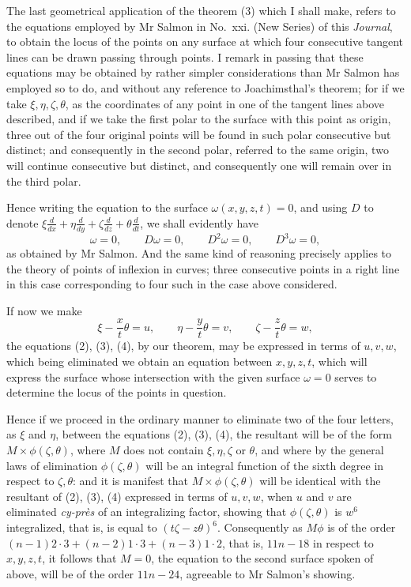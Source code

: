 \documentclass[11pt]{article}
\newcommand{\sourcepage}[1]{\marginpar{\scriptsize p.~#1}}
\begin{document}
{{The last geometrical application of the theorem (3) which I shall make, refers to the equations employed by Mr Salmon in No.~xxi. (New Series) of this \emph{Journal}, to obtain the locus of the points on any surface at which four consecutive tangent lines can be drawn passing through points. I remark in passing that these equations may be obtained by rather simpler considerations than Mr Salmon has employed so to do, and without any reference to Joachimsthal's theorem; for if we take $\xi,\eta,\zeta,\theta$, as the coordinates of any point in one of the tangent lines above described, and if we take the first polar to the surface with this point as origin, three out of the four original points will be found in such polar consecutive but distinct; and consequently in the second polar, referred to the same origin, two will continue consecutive but distinct, and consequently one will remain over in the third polar.

Hence writing the equation to the surface $\omega(x,y,z,t)=0$, and using $D$ to denote $\xi\frac{d}{dx}+\eta\frac{d}{dy}+\zeta\frac{d}{dz}+\theta\frac{d}{dt}$, we shall evidently have
\[
 \omega=0,\qquad D\omega=0,\qquad D^2\omega=0,
 \qquad D^3\omega=0,
\]
as obtained by Mr Salmon. And the same kind of reasoning precisely applies to the theory of points of inflexion in curves; three consecutive points in a right line in this case corresponding to four such in the case above considered.

If now we make
\[
 \xi-\frac{x}{t}\theta=u,
 \qquad
 \eta-\frac{y}{t}\theta=v,
 \qquad
 \zeta-\frac{z}{t}\theta=w,
\]
\sourcepage{178}
the equations (2), (3), (4), by our theorem, may be expressed in terms of $u,v,w$, which being eliminated we obtain an equation between $x,y,z,t$, which will express the surface whose intersection with the given surface $\omega=0$ serves to determine the locus of the points in question.

Hence if we proceed in the ordinary manner to eliminate two of the four letters, as $\xi$ and $\eta$, between the equations (2), (3), (4), the resultant will be of the form $M\times\phi(\zeta,\theta)$, where $M$ does not contain $\xi,\eta,\zeta$ or $\theta$, and where by the general laws of elimination $\phi(\zeta,\theta)$ will be an integral function of the sixth degree in respect to $\zeta,\theta$: and it is manifest that $M\times\phi(\zeta,\theta)$ will be identical with the resultant of (2), (3), (4) expressed in terms of $u,v,w$, when $u$ and $v$ are eliminated \emph{cy-pr\`es} of an integralizing factor, showing that $\phi(\zeta,\theta)$ is $w^6$ integralized, that is, is equal to $(t\zeta-z\theta)^6$. Consequently as $M\phi$ is of the order $(n-1)2\cdot3+(n-2)1\cdot3+(n-3)1\cdot2$, that is, $11n-18$ in respect to $x,y,z,t$, it follows that $M=0$, the equation to the second surface spoken of above, will be of the order $11n-24$, agreeable to Mr Salmon's showing.

}}
\end{document}
